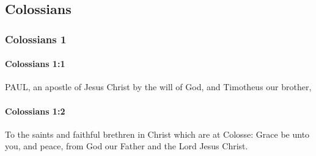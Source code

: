 \subsection{Colossians}
	\label{COLOSSIANS}

	\subsubsection{Colossians 1} %
		\label{COLOSSIANS-1}
		
		\paragraph{Colossians 1:1} %
			\label{COLOSSIANS-1-1}

			PAUL, an apostle of Jesus Christ by the will of God, and Timotheus our brother,

			\begin{framed}
			\scriptsize
				\begin{compactdesc}
					\item[SBLG] 
				\end{compactdesc}
			\end{framed}

		\paragraph{Colossians 1:2} %
			\label{COLOSSIANS-1-2}

			To the saints and faithful brethren in Christ which are at Colosse: Grace be unto you, and peace, from God our Father and the Lord Jesus Christ.

